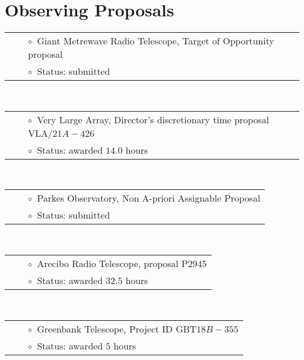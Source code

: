 \documentclass[11pt,letterpaper,sans,unicode]{moderncv}
\begin{document}
\section{Observing Proposals}
{\small
{}
\begin{tabular}{rcl}
&\hspace{0.4cm} &{\color{color1} $\circ\;\;$}Giant Metrewave Radio Telescope, Target of Opportunity proposal  \\
&\hspace{0.4cm} &{\color{color1} $\circ\;\;$}Status: submitted
\end{tabular} \\

\begin{tabular}{rcl}
&\hspace{0.4cm} &{\color{color1} $\circ\;\;$}Very Large Array, Director's discretionary time proposal VLA/$21A-426$ \\
&\hspace{0.4cm} &{\color{color1} $\circ\;\;$}Status: awarded $14.0$ hours
\end{tabular} \\

\begin{tabular}{rcl}
&\hspace{0.4cm} &{\color{color1} $\circ\;\;$}Parkes Observatory, Non A-priori Assignable Proposal \\
&\hspace{0.4cm} &{\color{color1} $\circ\;\;$}Status: submitted
\end{tabular} \\

\begin{tabular}{rcl}
&\hspace{0.4cm} &{\color{color1} $\circ\;\;$}Arecibo Radio Telescope, proposal P$2945$ \\
&\hspace{0.4cm} &{\color{color1} $\circ\;\;$}Status: awarded $32.5$ hours
\end{tabular} \\

\begin{tabular}{rcl}
&\hspace{0.4cm} &{\color{color1} $\circ\;\;$}Greenbank Telescope, Project ID GBT$18B-355$ \\
&\hspace{0.4cm} &{\color{color1} $\circ\;\;$}Status: awarded $5$ hours
\end{tabular}
}
\end{document}
